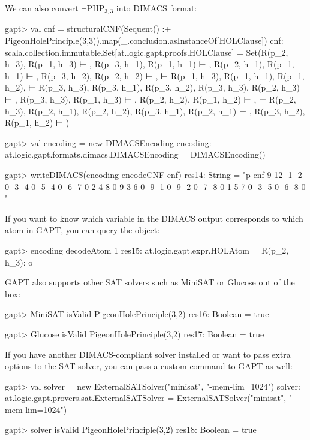 \documentclass[a4paper,11pt]{article}
\newcommand{\cli}[1]{{\ttfamily {#1}}}
\begin{document}
We can also convert $\neg\mathrm{PHP}_{3,3}$ into DIMACS format:
\begin{clilisting}
gapt> val cnf = structuralCNF(Sequent() :+ PigeonHolePrinciple(3,3)).map(_.conclusion.asInstanceOf[HOLClause])
cnf: scala.collection.immutable.Set[at.logic.gapt.proofs.HOLClause] = Set(R(p_2, h_3), R(p_1, h_3) ⊢ , R(p_3, h_1), R(p_1, h_1) ⊢ , R(p_2, h_1), R(p_1, h_1) ⊢ , R(p_3, h_2), R(p_2, h_2) ⊢ ,  ⊢ R(p_1, h_3), R(p_1, h_1), R(p_1, h_2),  ⊢ R(p_3, h_3), R(p_3, h_1), R(p_3, h_2), R(p_3, h_3), R(p_2, h_3) ⊢ , R(p_3, h_3), R(p_1, h_3) ⊢ , R(p_2, h_2), R(p_1, h_2) ⊢ ,  ⊢ R(p_2, h_3), R(p_2, h_1), R(p_2, h_2), R(p_3, h_1), R(p_2, h_1) ⊢ , R(p_3, h_2), R(p_1, h_2) ⊢ )

gapt> val encoding = new DIMACSEncoding
encoding: at.logic.gapt.formats.dimacs.DIMACSEncoding = DIMACSEncoding()

gapt> writeDIMACS(encoding encodeCNF cnf)
res14: String =
"p cnf 9 12
-1 -2 0
-3 -4 0
-5 -4 0
-6 -7 0
2 4 8 0
9 3 6 0
-9 -1 0
-9 -2 0
-7 -8 0
1 5 7 0
-3 -5 0
-6 -8 0
"

\end{clilisting}

If you want to know which variable in the DIMACS output corresponds to which
atom in GAPT, you can query the \cli{DIMACSEncoding} object:
\begin{clilisting}
gapt> encoding decodeAtom 1
res15: at.logic.gapt.expr.HOLAtom = R(p_2, h_3): o

\end{clilisting}

GAPT also supports other SAT solvers such as MiniSAT or Glucose out of the box:
\begin{clilisting}
gapt> MiniSAT isValid PigeonHolePrinciple(3,2)
res16: Boolean = true

\end{clilisting}
\begin{clilisting}
gapt> Glucose isValid PigeonHolePrinciple(3,2)
res17: Boolean = true

\end{clilisting}

If you have another DIMACS-compliant solver installed or want to pass extra
options to the SAT solver, you can pass a custom command to GAPT as well:
\begin{clilisting}
gapt> val solver = new ExternalSATSolver("minisat", "-mem-lim=1024")
solver: at.logic.gapt.provers.sat.ExternalSATSolver = ExternalSATSolver("minisat", "-mem-lim=1024")

gapt> solver isValid PigeonHolePrinciple(3,2)
res18: Boolean = true

\end{clilisting}
\end{document}
